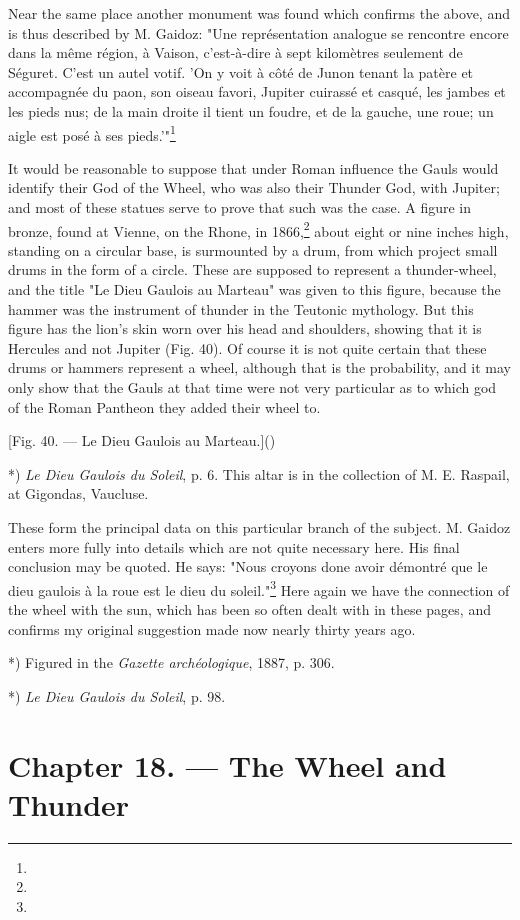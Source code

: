 \documentclass[a4paper, 11pt, oneside, polutonikogreek, english]{article}
\begin{document}
Near the same place another monument was found which confirms the above, and is thus described by M. Gaidoz: "Une représentation analogue se rencontre encore dans la même région, à Vaison, c'est-à-dire à sept kilomètres seulement de Séguret. C'est un autel votif. 'On y voit à côté de Junon tenant la patère et accompagnée du paon, son oiseau favori, Jupiter cuirassé et casqué, les jambes et les pieds nus; de la main droite il tient un foudre, et de la gauche, une roue; un aigle est posé à ses pieds.'"\footnote{}

It would be reasonable to suppose that under Roman influence the Gauls would identify their God of the Wheel, who was also their Thunder God, with Jupiter; and most of these statues serve to prove that such was the case. A figure in bronze, found at Vienne, on the Rhone, in 1866,\footnote{} about eight or nine inches high, standing on a circular base, is surmounted by a drum, from which project small drums in the form of a circle. These are supposed to represent a thunder-wheel, and the title "Le Dieu Gaulois au Marteau" was given to this figure, because the hammer was the instrument of thunder in the Teutonic mythology. But this figure has the lion's skin worn over his head and shoulders, showing that it is Hercules and not Jupiter (Fig. 40). Of course it is not quite certain that these drums or hammers represent a wheel, although that is the probability, and it may only show that the Gauls at that time were not very particular as to which god of the Roman Pantheon they added their wheel to.

[Fig. 40. --- Le Dieu Gaulois au Marteau.]()

*) \emph{Le Dieu Gaulois du Soleil}, p. 6. This altar is in the collection of M. E. Raspail, at Gigondas, Vaucluse.

These form the principal data on this particular branch of the subject. M. Gaidoz enters more fully into details which are not quite necessary here. His final conclusion may be quoted. He says: "Nous croyons done avoir démontré que le dieu gaulois à la roue est le dieu du soleil."\footnote{} Here again we have the connection of the wheel with the sun, which has been so often dealt with in these pages, and confirms my original suggestion made now nearly thirty years ago.

*) Figured in the \emph{Gazette archéologique}, 1887, p. 306.

*) \emph{Le Dieu Gaulois du Soleil}, p. 98.
\clearpage
\section{Chapter 18. --- The Wheel and Thunder}
\end{document}
